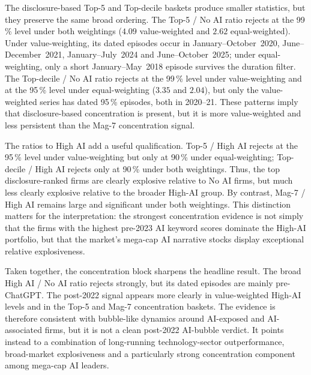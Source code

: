 The disclosure-based Top-5 and Top-decile baskets produce smaller statistics, but they preserve the same broad ordering. The Top-5 / No AI ratio rejects at the 99\,\% level under both weightings ($4.09$ value-weighted and $2.62$ equal-weighted). Under value-weighting, its dated episodes occur in January--October~2020, June--December~2021, January--July~2024 and June--October~2025; under equal-weighting, only a short January--May~2018 episode survives the duration filter. The Top-decile / No AI ratio rejects at the 99\,\% level under value-weighting and at the 95\,\% level under equal-weighting ($3.35$ and $2.04$), but only the value-weighted series has dated 95\,\% episodes, both in 2020--21. These patterns imply that disclosure-based concentration is present, but it is more value-weighted and less persistent than the Mag-7 concentration signal.
 
The ratios to High AI add a useful qualification. Top-5 / High AI rejects at the 95\,\% level under value-weighting but only at 90\,\% under equal-weighting; Top-decile / High AI rejects only at 90\,\% under both weightings. Thus, the top disclosure-ranked firms are clearly explosive relative to No AI firms, but much less clearly explosive relative to the broader High-AI group. By contrast, Mag-7 / High AI remains large and significant under both weightings. This distinction matters for the interpretation: the strongest concentration evidence is not simply that the firms with the highest pre-2023 AI keyword scores dominate the High-AI portfolio, but that the market's mega-cap AI narrative stocks display exceptional relative explosiveness.
 
Taken together, the concentration block sharpens the headline result. The broad High AI / No AI ratio rejects strongly, but its dated episodes are mainly pre-ChatGPT. The post-2022 signal appears more clearly in value-weighted High-AI levels and in the Top-5 and Mag-7 concentration baskets. The evidence is therefore consistent with bubble-like dynamics around AI-exposed and AI-associated firms, but it is not a clean post-2022 AI-bubble verdict. It points instead to a combination of long-running technology-sector outperformance, broad-market explosiveness and a particularly strong concentration component among mega-cap AI leaders.
 
